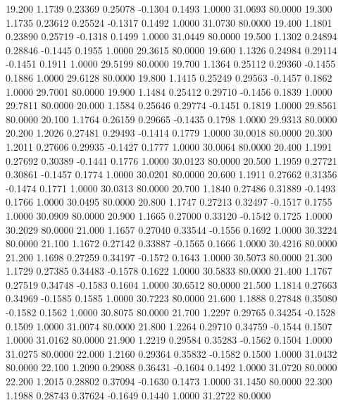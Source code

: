   19.200   1.1739   0.23369   0.25078  -0.1304   0.1493   1.0000  31.0693  80.0000
  19.300   1.1735   0.23612   0.25524  -0.1317   0.1492   1.0000  31.0730  80.0000
  19.400   1.1801   0.23890   0.25719  -0.1318   0.1499   1.0000  31.0449  80.0000
  19.500   1.1302   0.24894   0.28846  -0.1445   0.1955   1.0000  29.3615  80.0000
  19.600   1.1326   0.24984   0.29114  -0.1451   0.1911   1.0000  29.5199  80.0000
  19.700   1.1364   0.25112   0.29360  -0.1455   0.1886   1.0000  29.6128  80.0000
  19.800   1.1415   0.25249   0.29563  -0.1457   0.1862   1.0000  29.7001  80.0000
  19.900   1.1484   0.25412   0.29710  -0.1456   0.1839   1.0000  29.7811  80.0000
  20.000   1.1584   0.25646   0.29774  -0.1451   0.1819   1.0000  29.8561  80.0000
  20.100   1.1764   0.26159   0.29665  -0.1435   0.1798   1.0000  29.9313  80.0000
  20.200   1.2026   0.27481   0.29493  -0.1414   0.1779   1.0000  30.0018  80.0000
  20.300   1.2011   0.27606   0.29935  -0.1427   0.1777   1.0000  30.0064  80.0000
  20.400   1.1991   0.27692   0.30389  -0.1441   0.1776   1.0000  30.0123  80.0000
  20.500   1.1959   0.27721   0.30861  -0.1457   0.1774   1.0000  30.0201  80.0000
  20.600   1.1911   0.27662   0.31356  -0.1474   0.1771   1.0000  30.0313  80.0000
  20.700   1.1840   0.27486   0.31889  -0.1493   0.1766   1.0000  30.0495  80.0000
  20.800   1.1747   0.27213   0.32497  -0.1517   0.1755   1.0000  30.0909  80.0000
  20.900   1.1665   0.27000   0.33120  -0.1542   0.1725   1.0000  30.2029  80.0000
  21.000   1.1657   0.27040   0.33544  -0.1556   0.1692   1.0000  30.3224  80.0000
  21.100   1.1672   0.27142   0.33887  -0.1565   0.1666   1.0000  30.4216  80.0000
  21.200   1.1698   0.27259   0.34197  -0.1572   0.1643   1.0000  30.5073  80.0000
  21.300   1.1729   0.27385   0.34483  -0.1578   0.1622   1.0000  30.5833  80.0000
  21.400   1.1767   0.27519   0.34748  -0.1583   0.1604   1.0000  30.6512  80.0000
  21.500   1.1814   0.27663   0.34969  -0.1585   0.1585   1.0000  30.7223  80.0000
  21.600   1.1888   0.27848   0.35080  -0.1582   0.1562   1.0000  30.8075  80.0000
  21.700   1.2297   0.29765   0.34254  -0.1528   0.1509   1.0000  31.0074  80.0000
  21.800   1.2264   0.29710   0.34759  -0.1544   0.1507   1.0000  31.0162  80.0000
  21.900   1.2219   0.29584   0.35283  -0.1562   0.1504   1.0000  31.0275  80.0000
  22.000   1.2160   0.29364   0.35832  -0.1582   0.1500   1.0000  31.0432  80.0000
  22.100   1.2090   0.29088   0.36431  -0.1604   0.1492   1.0000  31.0720  80.0000
  22.200   1.2015   0.28802   0.37094  -0.1630   0.1473   1.0000  31.1450  80.0000
  22.300   1.1988   0.28743   0.37624  -0.1649   0.1440   1.0000  31.2722  80.0000

